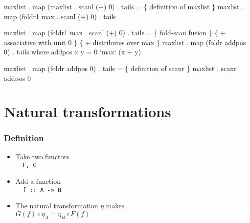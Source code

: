 \documentclass{beamer}
\newcommand{\cb}[1]{{\color{violet}#1}}
\begin{document}
\begin{frame}[fragile,t]
\begin{center}
\begin{overprint}
\begin{semiverbatim}
  maxlist . map (\cb{maxlist} . scanl (+) 0) . tails
=    \{ definition of maxlist \}
  maxlist . map (\cb{foldr1 max} . scanl (+) 0) . tails
\end{semiverbatim}

\begin{semiverbatim}
  maxlist . map (\cb{foldr1 max . scanl (+) 0}) . tails
=    \{ fold-scan fusion \}
     \{ + associative with unit 0 \}
     \{ + distributes over max \}
  maxlist . map (\cb{foldr addpos 0}) . tails
    where
      addpos x y = 0 `max` (x + y)
\end{semiverbatim}

\begin{semiverbatim}
  maxlist . \cb{map (foldr addpos 0) . tails}
=    \{ definition of scanr \}
  maxlist . \cb{scanr addpos 0}
\end{semiverbatim}

\end{overprint}
\end{center}

\end{frame}

\section{Natural transformations}

\begin{frame}[fragile]
    \frametitle{Definition}

    \begin{itemize}
        \item Take two functors \\
        \verb?  F, G?
        \item Add a function \\
        \verb?  f :: A -> B?
        \item The natural transformation $\eta$ makes \\ 
            $G(f) \circ \eta_A = \eta_B \circ F(f)$
    \end{itemize}

\end{frame}
\end{document}

